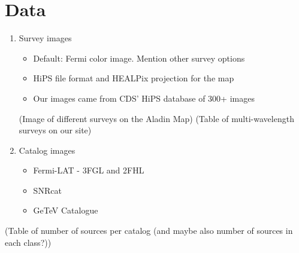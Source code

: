 \section{Data}


\begin{enumerate}
\item Survey images

  \begin{itemize}

  \item Default: Fermi color image. Mention other survey options

  \item HiPS file format and HEALPix projection for the map

  \item Our images came from CDS' HiPS database of 300+ images

  \end{itemize}
  
(Image of different surveys on the Aladin Map)
(Table of multi-wavelength surveys on our site)

\item Catalog images

  \begin{itemize}

  \item Fermi-LAT - 3FGL and 2FHL

  \item SNRcat

  \item GeTeV Catalogue

  \end{itemize}
\end{enumerate}

(Table of number of sources per catalog (and maybe also number of sources in each class?))
